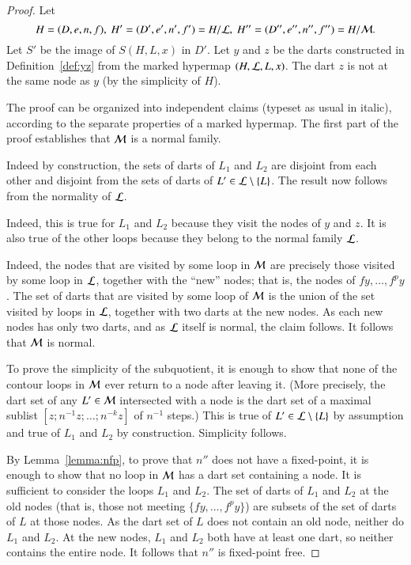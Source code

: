 \begin{proof} Let 
\[ 
H=(D,e,n,f),\   H' =(D',e',n',f') = H/{\cal
    L},\  H'' = (D'',e'',n'',f'') = H/{\cal M}.   
\] 
Let $S'$ be the image of $S(H,L,x)$ in $D'$.  Let $y$ and $z$ be the darts
constructed in Definition~\ref{def:yz} from the marked hypermap $(H,{\cal
  L},L,x)$.  The dart $z$ is not at the same node as $y$ (by
the simplicity of $H$).

The proof can be organized into independent claims (typeset as usual in italic), according to the
separate properties of a marked hypermap.  The first part of the proof
establishes that ${\cal M}$ is a normal family.


 
Indeed by construction, the sets of darts of $L_1$ and $L_2$ are
disjoint from each other and disjoint from the sets of darts of $L'\in
{\cal L}\setminus \{L\}$.  The result now follows from the normality
of ${\cal L}$.

   Indeed, this
is true for $L_1$ and $L_2$ because they visit the nodes of $y$ and
$z$.  It is also true of the other loops because they belong to the
normal family ${\cal L}$. 

  
Indeed, the nodes that are visited by some loop in ${\cal M}$ are
precisely those visited by some loop in ${\cal L}$, together with the
``new'' nodes; that is, the nodes of $f y,\ldots,f^p y$.  The set of
darts that are visited by some loop of ${\cal M}$ is the union of the
set visited by loops in ${\cal L}$, together with two darts at the
new nodes.  As each new nodes has only two darts, and as ${\cal L}$ itself
is normal, the claim follows. It follows that ${\cal M}$ is normal.  


 To prove the simplicity of the subquotient, it is enough
to show that none of the contour loops in ${\cal M}$ ever return to a
node after leaving it.  (More precisely, the dart set of any
$L'\in{\cal M}$ intersected with a node is the dart set of a maximal
sublist $[z;n^{-1}z;\ldots;n^{-k}z]$ of $n^{-1}$ steps.)  This is true
of $L'\in{\cal L}\setminus\{L\}$ by assumption and true of $L_1$ and
$L_2$ by construction.  Simplicity follows.

 By Lemma~\ref{lemma:nfp}, to prove that $n''$
does not have a fixed-point, it is enough to show that no loop in
${\cal M}$ has a dart set containing a node.  It is sufficient to
consider the loops $L_1$ and $L_2$.  The set of darts of $L_1$ and
$L_2$ at the old nodes (that is, those not meeting $\{f y,\ldots,f^p
y\}$) are subsets of the set of darts of $L$ at those nodes.  As the
dart set of $L$ does not contain an old node, neither do $L_1$ and
$L_2$.  At the new nodes, $L_1$ and $L_2$ both have at least one dart,
so neither contains the entire node.  It follows that $n''$ is
fixed-point free.


\end{proof}
